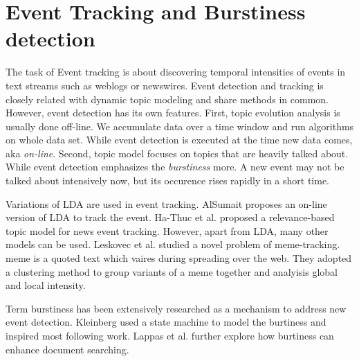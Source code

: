 \section {Event Tracking and Burstiness detection}
The task of Event tracking is about discovering temporal intensities of events in text streams such as weblogs or newswires. Event detection and tracking is closely related with dynamic topic modeling and share methods in common. However, event detection has its own features. First, topic evolution analysis is usually done off-line. We accumulate data over a time window and run algorithms on whole data set. While event detection is executed at the time new data comes, aka {\em on-line}. Second, topic model focuses on topics that are heavily talked about. While event detection emphasizes the {\em burstiness} more. A new event may not be talked about intensively now, but its occurence rises rapidly in a short time. 

Variations of LDA are used in event tracking. AlSumait\cite{alsumait2008line} proposes an on-line version of LDA to track the event. Ha-Thuc et al. proposed a relevance-based topic model for news event tracking\cite{ha2009relevance}.   
However, apart from LDA, many other models can be used. Leskovec et al. \cite{leskovec2009meme} studied a novel problem of meme-tracking. meme is a quoted text which vaires during spreading over the web. They adopted a clustering method to group variants of a meme together and analyisis global and local intensity.

Term burstiness has been extensively researched as a mechanism to address new event detection. Kleinberg \cite{kleinberg2003bursty} used a state machine to model the burtiness and inspired most following work. Lappas et al. \cite{lappas2009burstiness} further explore how burtiness can enhance document searching.






